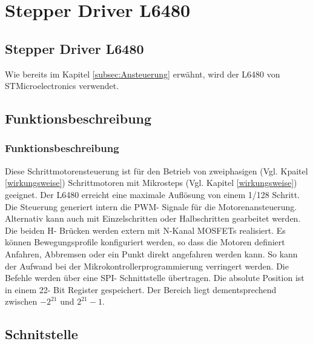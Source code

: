 \ifSTANDALONE
\section{Stepper Driver L6480} \label{sec:L6480}
\fi
\ifEMBED
\subsection{Stepper Driver L6480} \label{sec:L6480}
\fi

\ifEMBED
    \BLDCcollab
\fi
    	Wie bereits im Kapitel \ref*{subsec:Ansteuerung} erwähnt, wird der L6480 von STMicroelectronics verwendet. 
	  	 \ifSTANDALONE
	  	 \subsection{Funktionsbeschreibung}
	  	 \fi
	  	 \ifEMBED
	  	 \subsubsection{Funktionsbeschreibung}
	  	 \fi
		 	Diese Schrittmotorensteuerung ist für den Betrieb von zweiphasigen (Vgl. Kpaitel \ref{wirkungsweise}) Schrittmotoren mit Mikrosteps (Vgl. Kapitel \ref{wirkungsweise}) geeignet. Der L6480 erreicht eine maximale Auflösung von einem 1/128 Schritt. Die Steuerung generiert intern die PWM- Signale für die Motorenansteuerung. Alternativ kann auch mit Einzelschritten oder Halbschritten gearbeitet werden. Die beiden H- Brücken werden extern mit N-Kanal MOSFETs realisiert. Es können Bewegungsprofile konfiguriert werden, so dass die Motoren definiert Anfahren, Abbremsen oder ein Punkt direkt angefahren werden kann. So kann der Aufwand bei der Mikrokontrollerprogrammierung verringert werden. Die Befehle werden über eine SPI- Schnittstelle übertragen. Die absolute Position ist in einem 22- Bit Register gespeichert. Der Bereich liegt dementsprechend zwischen \(-2^{21}\) und \(2^{21}-1\).
		 \ifSTANDALONE
		 \subsection{Schnitstelle}
		 \fi
		 \ifEMBED
